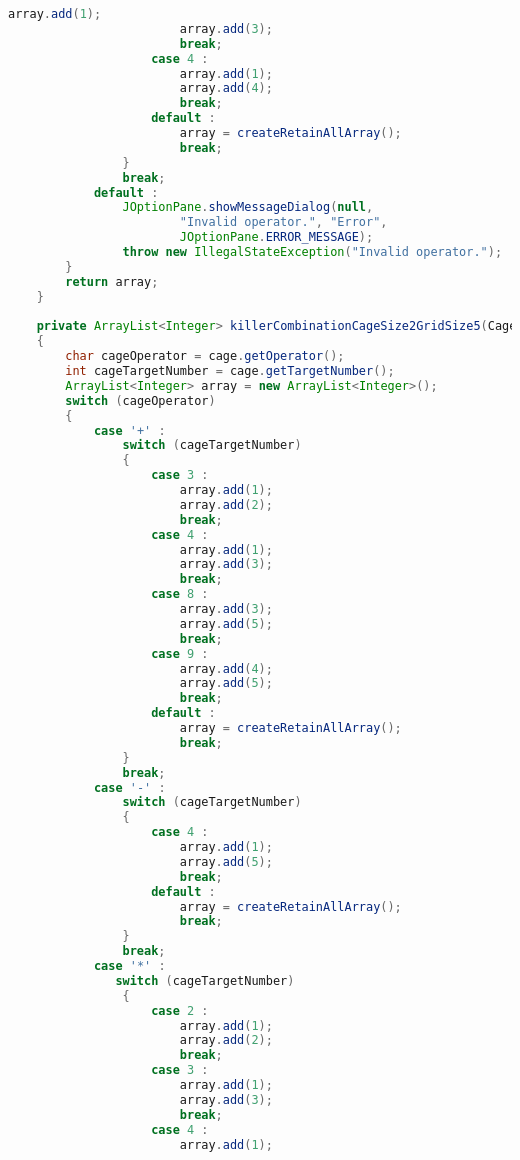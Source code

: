 \begin{lstlisting}[language=Java,basicstyle=\tiny,caption=SolverRuleBased.java]
                        array.add(1);
                        array.add(3);
                        break;
                    case 4 :
                        array.add(1);
                        array.add(4);
                        break;
                    default :
                        array = createRetainAllArray();
                        break;
                }
                break;
            default :
                JOptionPane.showMessageDialog(null, 
                        "Invalid operator.", "Error", 
                        JOptionPane.ERROR_MESSAGE);
                throw new IllegalStateException("Invalid operator.");
        }
        return array;
    }
    
    private ArrayList<Integer> killerCombinationCageSize2GridSize5(Cage cage)
    {
        char cageOperator = cage.getOperator();
        int cageTargetNumber = cage.getTargetNumber();
        ArrayList<Integer> array = new ArrayList<Integer>();
        switch (cageOperator)
        {
            case '+' :
                switch (cageTargetNumber)
                {
                    case 3 :
                        array.add(1);
                        array.add(2);
                        break;
                    case 4 :  
                        array.add(1);
                        array.add(3);
                        break;
                    case 8 :
                        array.add(3);
                        array.add(5);
                        break;
                    case 9 :
                        array.add(4);
                        array.add(5);
                        break;
                    default :
                        array = createRetainAllArray();
                        break;
                }
                break;
            case '-' :
                switch (cageTargetNumber)
                {
                    case 4 :
                        array.add(1);
                        array.add(5);
                        break;
                    default :
                        array = createRetainAllArray();
                        break;
                }
                break;
            case '*' :
               switch (cageTargetNumber)
                {
                    case 2 :
                        array.add(1);
                        array.add(2);
                        break;
                    case 3 :
                        array.add(1);
                        array.add(3);
                        break;
                    case 4 :
                        array.add(1);

\end{lstlisting}
